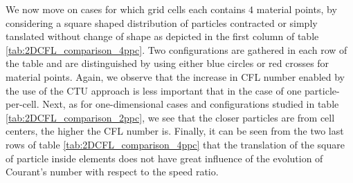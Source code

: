 We now move on cases for which grid cells each contains $4$ material points, by considering a square shaped distribution of particles contracted or simply tanslated without change of shape as depicted in the first column of table \ref{tab:2DCFL_comparison_4ppc}. Two configurations are gathered in each row of the table and are distinguished by using either blue circles or red crosses for material points. Again, we observe that the increase in CFL number enabled by the use of the CTU approach is less important that in the case of one particle-per-cell. Next, as for one-dimensional cases and configurations studied in table \ref{tab:2DCFL_comparison_2ppc}, we see that the closer particles are from cell centers, the higher the CFL number is. Finally, it can be seen from the two last rows of table \ref{tab:2DCFL_comparison_4ppc} that the translation of the square of particle inside elements does not have great influence of the evolution of Courant's number with respect to the speed ratio. 




